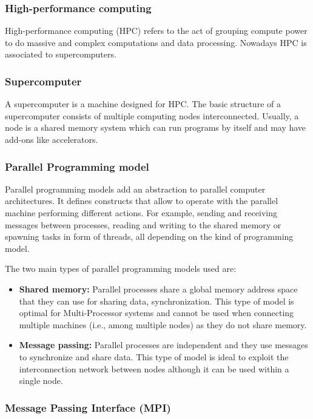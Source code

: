 \subsubsection{High-performance computing}

\justify
High-performance computing (HPC) refers to the act of grouping compute power to do massive and complex computations and data processing. Nowadays HPC is associated to supercomputers.

\subsubsection{Supercomputer}

\justify
A supercomputer is a machine designed for HPC. The basic structure of a supercomputer consists of multiple computing nodes interconnected. Usually, a node is a shared memory system which can run programs by itself and may have add-ons like accelerators.

\subsubsection{Parallel Programming model}

\justify
Parallel programming models \cite{programminModels} add an abstraction to parallel computer architectures.  It defines constructs that allow to operate with the parallel machine performing different actions. For example, sending and receiving messages between processes, reading and writing to the shared memory or spawning tasks in form of threads, all depending on the kind of programming model.

\justify
The two main types of parallel programming models used are:
\begin{itemize}
  \item \textbf{Shared memory:} Parallel processes share a global memory address space that they can use for sharing data, synchronization. This type of model is optimal for Multi-Processor systems and cannot be used when connecting multiple machines (i.e., among multiple nodes) as they do not share memory.
  \item \textbf{Message passing:} Parallel processes are independent and they use messages to synchronize and share data. This type of model is ideal to exploit the interconnection network between nodes although it can be used within a single node.
\end{itemize}

\subsubsection{Message Passing Interface (MPI)}

